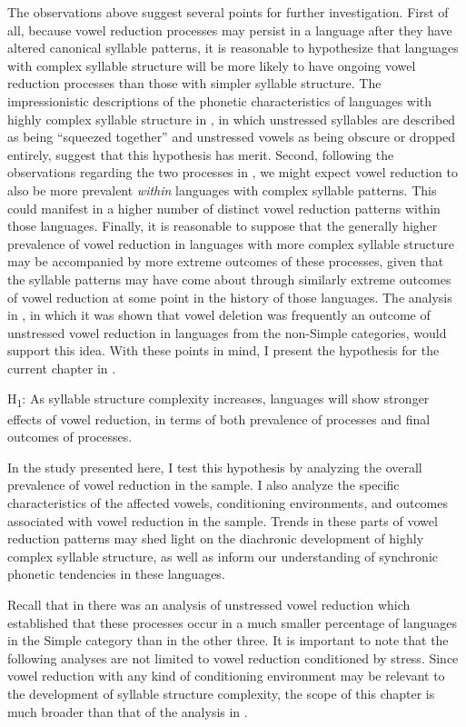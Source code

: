   The observations above suggest several points for further investigation. First of all, because vowel reduction processes may persist in a language after they have altered canonical syllable patterns, it is reasonable to hypothesize that languages with complex syllable structure will be more likely to have ongoing vowel reduction processes than those with simpler syllable structure. The impressionistic descriptions of the phonetic characteristics of languages with highly complex syllable structure in , in which unstressed syllables are described as being “squeezed together” and unstressed vowels as being obscure or dropped entirely, suggest that this hypothesis has merit. Second, following the observations regarding the two processes in , we might expect vowel reduction to also be more prevalent \textit{within} languages with complex syllable patterns. This could manifest in a higher number of distinct vowel reduction patterns within those languages. Finally, it is reasonable to suppose that the generally higher prevalence of vowel reduction in languages with more complex syllable structure may be accompanied by more extreme outcomes of these processes, given that the syllable patterns may have come about through similarly extreme outcomes of vowel reduction at some point in the history of those languages. The analysis in , in which it was shown that vowel deletion was frequently an outcome of unstressed vowel reduction in languages from the non-Simple categories, would support this idea. With these points in mind, I present the hypothesis for the current chapter in .

\ea\label{ex:6.3}
   H\textsubscript{1}:  As syllable structure complexity increases, languages will show stronger effects of vowel reduction, in terms of both prevalence of processes and final outcomes of processes.
\z

  In the study presented here, I test this hypothesis by analyzing the overall prevalence of vowel reduction in the sample. I also analyze the specific characteristics of the affected vowels, conditioning environments, and outcomes associated with vowel reduction in the sample. Trends in these parts of vowel reduction patterns may shed light on the diachronic development of highly complex syllable structure, as well as inform our understanding of synchronic phonetic tendencies in these languages.

  Recall that in  there was an analysis of unstressed vowel reduction which established that these processes occur in a much smaller percentage of languages in the Simple category than in the other three. It is important to note that the following analyses are not limited to vowel reduction conditioned by stress. Since vowel reduction with any kind of conditioning environment may be relevant to the development of syllable structure complexity, the scope of this chapter is much broader than that of the analysis in .

